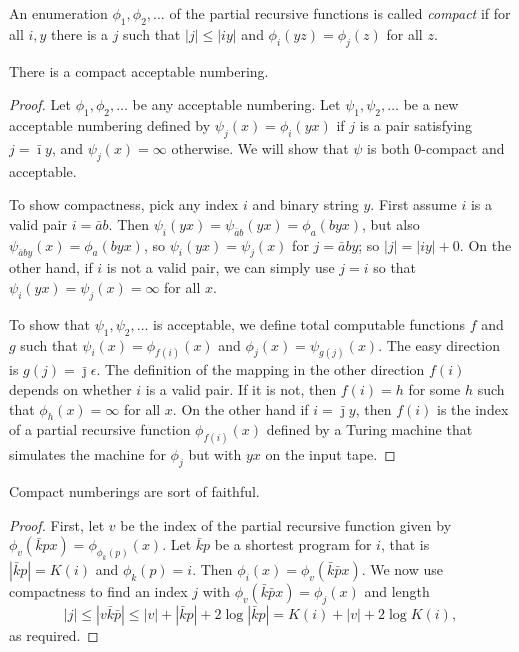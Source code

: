 \documentclass{style/llncs}
\begin{document}
\begin{definition}
  An enumeration $\phi_1,\phi_2,\ldots$ of the partial recursive
  functions is called \emph{compact} if for all $i,y$ there is a $j$
  such that $|j|\le|i y|$ and $\phi_i(y z)=\phi_j(z)$ for all $z$.
\end{definition}

\begin{lemma}
There is a compact acceptable numbering.
\end{lemma}
\begin{proof}
  Let $\phi_1,\phi_2,\ldots$ be any acceptable numbering. Let $\psi_1,\psi_2,\ldots$ be a new acceptable numbering defined by $\psi_j(x)=\phi_i(y x)$ if $j$ is a pair satisfying $j=\bar\imath y$, and $\psi_j(x)=\infty$ otherwise.  We will show that $\psi$ is both $0$-compact and acceptable. 

To show compactness, pick any index $i$ and binary string $y$. First assume $i$ is a valid pair $i=\bar a b$. Then  $\psi_i(y x) = \psi_{\bar a b}(y x)=\phi_a(b y x)$, but also $\psi_{\bar a b y}(x)=\phi_a(b y x)$, so $\psi_i(y x) = \psi_j(x)$ for $j=\bar a b y$; so $|j|=|iy|+0$. On the other hand, if $i$ is not a valid pair, we can simply use $j=i$ so that $\psi_i(y x)=\psi_j(x)=\infty$ for all $x$.

To show that $\psi_1,\psi_2,\ldots$ is acceptable, we define total
computable functions $f$ and $g$ such that $\psi_i(x)=\phi_{f(i)}(x)$
and $\phi_j(x)=\psi_{g(j)}(x)$. The easy direction is
$g(j)=\bar\jmath\epsilon$. The definition of the mapping in the other
direction $f(i)$ depends on whether $i$ is a valid pair. If it is not,
then $f(i)=h$ for some $h$ such that $\phi_h(x)=\infty$ for all $x$. On the other hand if $i=\bar\jmath y$, then $f(i)$ is the index of a partial recursive function $\phi_{f(i)}(x)$ defined by a Turing machine that simulates the machine for $\phi_j$ but with $yx$ on the input tape.
\end{proof}


\begin{lemma}
Compact numberings are sort of faithful.
\end{lemma}
\begin{proof}
First, let $v$ be the index of the partial recursive function given by $\phi_v(\bar k p x)=\phi_{\phi_k(p)}(x)$. Let $\bar k p$ be a shortest program for $i$, that is $|\bar k p| = K(i)$ and $\phi_k(p)=i$. Then $\phi_i(x)=\phi_v(\bar k \bar p x)$. We now use compactness to find an index $j$ with $\phi_v(\bar k \bar p x)=\phi_j(x)$ and length
\[|j|\le |v\bar k\bar p|\le|v|+|\bar k p|+2\log|\bar k p|=K(i)+|v|+2\log K(i),\]
as required.
\end{proof}




\end{document}
